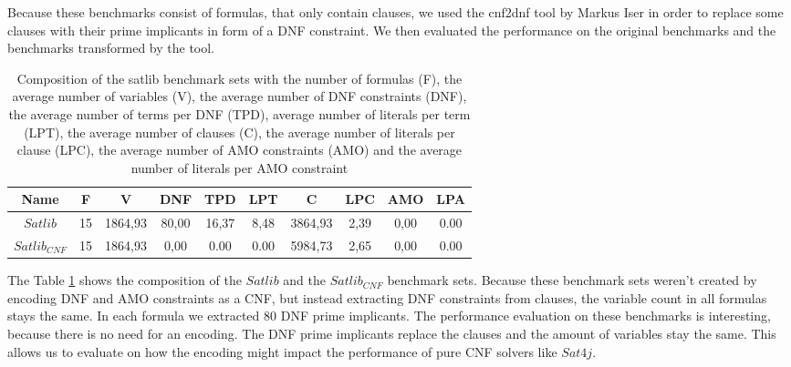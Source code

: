 Because these benchmarks consist of formulas, that only contain clauses, we used the cnf2dnf tool \cite{iser_pi-explanations_2022} by Markus Iser in order to replace some clauses with their prime implicants in form of a DNF constraint. We then evaluated the performance on the original benchmarks and the benchmarks transformed by the tool.

\begin{table}[!htb]
\centering
\caption[Composition of the satlib benchmark sets]{Composition of the satlib benchmark sets with the number of formulas (F), the average number of variables (V), the average number of DNF constraints (DNF), the average number of terms per DNF (TPD), average number of literals per term (LPT), the average number of clauses (C), the average number of literals per clause (LPC), the average number of AMO constraints (AMO) and the average number of literals per AMO constraint}
\label{tab:satlib}
\begin{tabular}{|c|c|c|c|c|c|c|c|c|c|}
\hline
Name & F & V & DNF & TPD & LPT & C & LPC & AMO & LPA \\
\hline
$Satlib$ & 15 & 1864,93 & 80,00 & 16,37 & 8,48 & 3864,93 & 2,39 & 0,00 & 0.00 \\ 
 \hline 
$Satlib_{CNF}$ & 15 & 1864,93 & 0,00 & 0.00 & 0.00 & 5984,73 & 2,65 & 0,00 & 0.00 \\ 
 \hline 
\end{tabular}
\end{table}

The Table \ref{tab:satlib} shows the composition of the $Satlib$ and the $Satlib_{CNF}$ benchmark sets. Because these benchmark sets weren't created by encoding DNF and AMO constraints as a CNF, but instead extracting DNF constraints from clauses, the variable count in all formulas stays the same. In each formula we extracted 80 DNF prime implicants. The performance evaluation on these benchmarks is interesting, because there is no need for an encoding. The DNF prime implicants replace the clauses and the amount of variables stay the same. This allows us to evaluate on how the encoding might impact the performance of pure CNF solvers like $Sat4j$.




